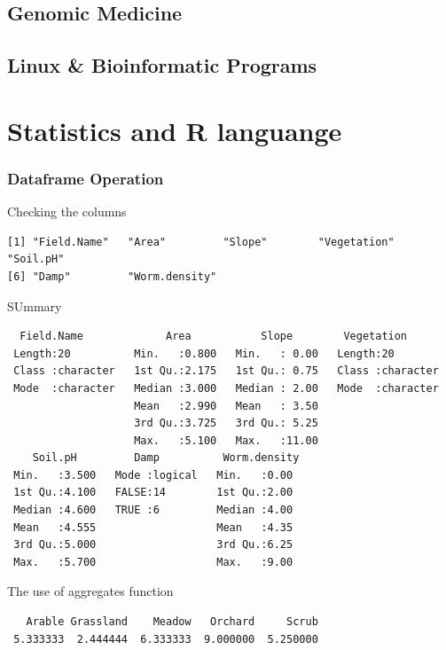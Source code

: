 \documentclass[
  letterpaper,
  DIV=11,
  numbers=noendperiod]{scrreprt}
\begin{document}
\chapter{Genomic Medicine}\label{genomic-medicine}

\chapter{Linux \& Bioinformatic
Programs}\label{linux-bioinformatic-programs}

\part{Statistics and R languange}

\section*{Dataframe Operation}\label{dataframe-operation}


Checking the columns

\begin{verbatim}
[1] "Field.Name"   "Area"         "Slope"        "Vegetation"   "Soil.pH"     
[6] "Damp"         "Worm.density"
\end{verbatim}

SUmmary

\begin{verbatim}
  Field.Name             Area           Slope        Vegetation       
 Length:20          Min.   :0.800   Min.   : 0.00   Length:20         
 Class :character   1st Qu.:2.175   1st Qu.: 0.75   Class :character  
 Mode  :character   Median :3.000   Median : 2.00   Mode  :character  
                    Mean   :2.990   Mean   : 3.50                     
                    3rd Qu.:3.725   3rd Qu.: 5.25                     
                    Max.   :5.100   Max.   :11.00                     
    Soil.pH         Damp          Worm.density 
 Min.   :3.500   Mode :logical   Min.   :0.00  
 1st Qu.:4.100   FALSE:14        1st Qu.:2.00  
 Median :4.600   TRUE :6         Median :4.00  
 Mean   :4.555                   Mean   :4.35  
 3rd Qu.:5.000                   3rd Qu.:6.25  
 Max.   :5.700                   Max.   :9.00  
\end{verbatim}

The use of aggregates function

\begin{verbatim}
   Arable Grassland    Meadow   Orchard     Scrub 
 5.333333  2.444444  6.333333  9.000000  5.250000 
\end{verbatim}
\end{document}
